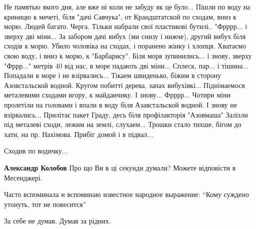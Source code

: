 Не памятью якого дня, але вже ні коли не забуду як це було... Пішли по воду на
криницю к мечеті, біля "дачі Савчука", от Крандштатской по сходам, вниз к морю.
Людей багато. Черга. Тільки набрали свої пластикові бутилі.. "Фрррр... і зверху
дві міни... За забором дачі вибух (ми снизу і нижче), другий вибух біля сходів к
морю. Убило чоловіка на сходах, і поранено жінку і хлопця. Хватаємо свою воду,
і вниз к морю, к "Барбарису". Біля моря зупинились... і знову, зверху "Фррр..."
метрів 40 від нас, в море падають дві міни... Сплеск, пар... і тішина...
Попадали в море і не взірвались... Тікаем швиденько, біжим в сторону
Азовстальской водной. Кругом побитті дерева, запах вибухівкі... Піднімаемося
металевими сходами вгору, к майданчику. І знову... Фрррр... Чотири міни
пролетіли на головами і впали в воду біля Азавстальской водной. І знову не
взірвались... Прилітає пакет Граду, десь біля профілакторія "Азовмаша" Залізли
під металеві сходи, лежим на землі, слухаем... Трошки стало тихше, бігом до
хати, на пр. Нахімова. Прибіг домой і в підвал...

Сходив по водичку...

\begin{itemize} %
\textbf{Александр Колобов} Про що Ви в ці секунди думали?
Можете відповісти в Месенджері.
\end{itemize} %


Часто вспоминала и вспоминаю известное народное выражение: \enquote{Кому суждено утонуть, тот не повесится}


За себе не думав. Думав за рідних.

